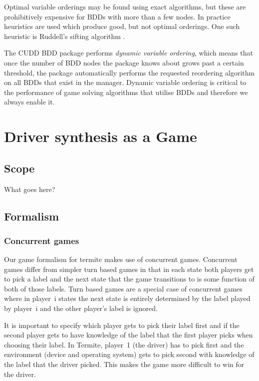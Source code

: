 \documentclass{book}
\theoremstyle{definition}
\begin{document}
Optimal variable orderings may be found using exact algorithms, but these are prohibitively expensive for BDDs with more than a few nodes. In practice heuristics are used which produce good, but not optimal orderings. One such heuristic is Ruddell's sifting algorithm \cite{sifting}.

The CUDD BDD package performs \emph{dynamic variable ordering}, which means that once the number of BDD nodes the package knows about grows past a certain threshold, the package automatically performs the requested reordering algorithm on all BDDs that exist in the manager. Dynamic variable ordering is critical to the performance of game solving algorithms that utilise BDDs and therefore we always enable it.

\chapter{Driver synthesis as a Game}

\section{Scope}
What goes here?

\section{Formalism}

\subsection{Concurrent games}

Our game formalism for termite makes use of concurrent games. Concurrent games differ from simpler turn based games in that in each state both players get to pick a label and the next state that the game transitions to is some function of both of those labels. Turn based games are a special case of concurrent games where in player~i states the next state is entirely determined by the label played by player~i and the other player's label is ignored. 

It is important to specify which player gets to pick their label first and if the second player gets to have knowledge of the label that the first player picks when choosing their label. In Termite, player~1 (the driver) has to pick first and the environment (device and operating system) gets to pick second with knowledge of the label that the driver picked. This makes the game more difficult to win for the driver.
\end{document}
